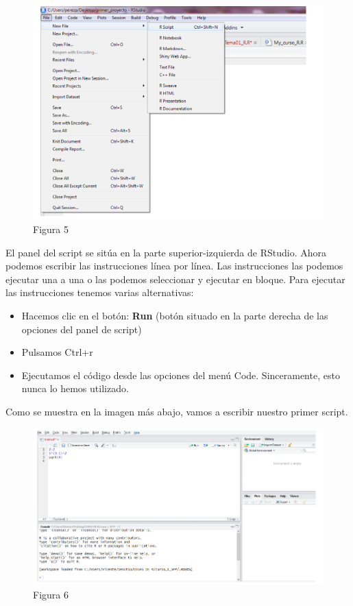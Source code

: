 \documentclass[
]{book}
\begin{document}
\begin{figure}
\centering
\includegraphics{imagenes/06.png}
\caption{Figura 5}
\end{figure}

El panel del script se sitúa en la parte superior-izquierda de RStudio. Ahora podemos escribir las instrucciones línea por línea. Las instrucciones las podemos ejecutar una a una o las podemos seleccionar y ejecutar en bloque. Para ejecutar las instrucciones tenemos varias alternativas:

\begin{itemize}
\item
  Hacemos clic en el botón: \textbf{Run} (botón situado en la parte derecha de las opciones del panel de script)
\item
  Pulsamos Ctrl+r
\item
  Ejecutamos el código desde las opciones del menú Code. Sinceramente, esto nunca lo hemos utilizado.
\end{itemize}

Como se muestra en la imagen más abajo, vamos a escribir nuestro primer script.

\begin{figure}
\centering
\includegraphics{imagenes/07.png}
\caption{Figura 6}
\end{figure}
\end{document}
